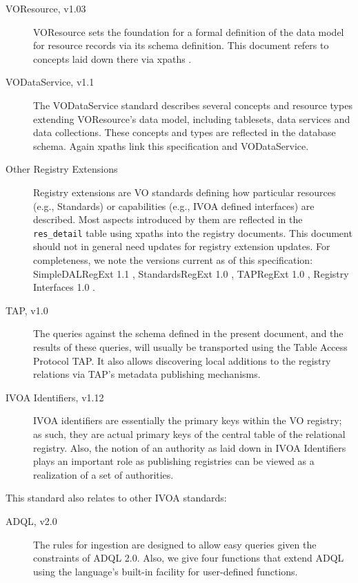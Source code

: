 \documentclass[11pt,a4paper]{ivoa}
\newcommand{\rtent}[1]{\texttt{\color{rtcolor} #1}}
\begin{document}
\begin{description}
\item[VOResource, v1.03 \citep{std:VOR}] VOResource sets the foundation for a formal definition of the data
model for resource records via its schema definition.  This document
refers to concepts laid down there via xpaths \citep{std:XPATH}.
\item[VODataService, v1.1 \citep{std:VODS11}] The VODataService standard 
describes several concepts and resource types extending 
VOResource's data model, including
tablesets, data services and data
collections.  These concepts and types are reflected in the database
schema.  Again xpaths link this specification and VODataService.
\item[Other Registry Extensions]Registry extensions are VO standards
defining how particular resources (e.g., Standards) or capabilities
(e.g., IVOA defined interfaces) are described.  Most aspects
introduced by them are reflected in the \rtent{res\_detail} table using
xpaths into the registry documents.
This document should not in general need updates
for registry extension updates.  For completeness, we note the
versions current as of this specification: SimpleDALRegExt 1.1
\citep{2017ivoa.spec.0530P},
StandardsRegExt 1.0 \citep{std:STDREGEXT}, TAPRegExt 1.0
\citep{std:TAPREGEXT}, Registry Interfaces 1.0
\citep{std:RI1}.
\item[TAP, v1.0 \citep{std:TAP}]The queries against the schema defined in the present document, and the results of
these queries, will usually be transported using the Table Access
Protocol TAP.  It also allows discovering
local additions to the registry relations via TAP's metadata publishing
mechanisms.
\item[IVOA Identifiers, v1.12 \citep{std:VOID}]IVOA identifiers are
essentially the primary keys within the VO
registry; as such, they are actual primary keys of the central table of
the relational registry. Also, the notion of an authority as laid down
in IVOA Identifiers plays an important role as publishing registries can
be viewed as a realization of a set of authorities.

\end{description}

This standard also relates to other IVOA standards:


\begin{description}
\item[ADQL, v2.0 \citep{std:ADQL}]The rules for ingestion are designed to allow
easy queries given the constraints of ADQL 2.0.  Also,
we give four functions that extend ADQL using the
language's built-in facility for user-defined functions.
\end{description}
\end{document}
